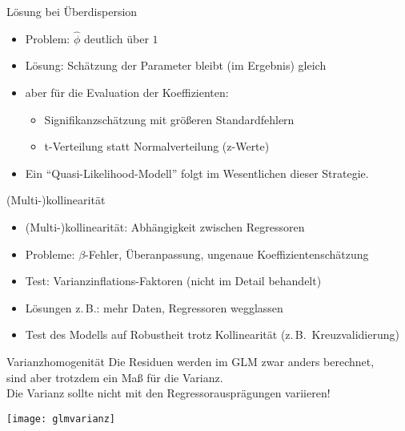 \begin{frame}
  {Lösung bei Überdispersion}
  \begin{itemize}[<+->]
    \item Problem: \alert{$\hat{\phi}$ deutlich über $1$}
    \item Lösung: Schätzung der Parameter bleibt (im Ergebnis) gleich
    \item aber für die Evaluation der Koeffizienten:
      \begin{itemize}[<+->]
	\item Signifikanzschätzung mit größeren Standardfehlern
	\item t-Verteilung statt Normalverteilung (z-Werte)
      \end{itemize}
     \vspace{0.5cm}
    \item Ein "`Quasi-Likelihood-Modell"' folgt im Wesentlichen dieser Strategie.
  \end{itemize}
\end{frame}

\begin{frame}
  {(Multi-)kollinearität}
  \begin{itemize}[<+->]
    \item \alert{(Multi-)kollinearität}: Abhängigkeit zwischen Regressoren
    \item Probleme: $\beta$-Fehler, Überanpassung, ungenaue Koeffizientenschätzung
    \item Test: \alert{Varianzinflations-Faktoren} (nicht im Detail behandelt)
    \item Lösungen z.\,B.: mehr Daten, Regressoren wegglassen
    \item Test des Modells auf Robustheit trotz Kollinearität (z.\,B.\ Kreuzvalidierung)
  \end{itemize}
\end{frame}

\begin{frame}
  {Varianzhomogenität}
  Die Residuen werden im GLM zwar anders berechnet,\\
  sind aber trotzdem ein Maß für die Varianz.\\[3ex]
  \alert{Die Varianz sollte nicht mit den Regressorausprägungen variieren!}\\

  \begin{center}
    \texttt{[image: glmvarianz]}
  \end{center}
\end{frame}

